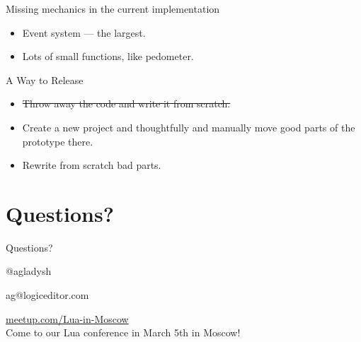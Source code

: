 \documentclass[aspectratio=169,handout,bigger]{beamer}
\newcommand{\soutt}[1]{%
    \renewcommand{\ULthickness}{1pt}%
       \sout{#1}%
    \renewcommand{\ULthickness}{.4pt}%
}
\begin{document}
\begin{frame}{Missing mechanics in the current implementation}
  \begin{itemize}
    \item Event system --- the largest.
    \item Lots of small functions, like pedometer.
  \end{itemize}
\end{frame}


\begin{frame}{A Way to Release}
  \begin{itemize}
    \item \soutt{Throw away the code and write it from scratch.}
    \item Create a new project and thoughtfully and manually
          move good parts of the prototype there.
    \item Rewrite from scratch bad parts.
  \end{itemize}
\end{frame}



\section{Questions?}

\begin{frame}[plain]{Questions?}

\begin{center}
\Huge{@agladysh}
\end{center}

\begin{center}
\Large{ag@logiceditor.com}
\end{center}

\begin{center}
\href{http://meetup.com/Lua-in-Moscow}{meetup.com/Lua-in-Moscow}
\\
Come to our Lua conference in March 5th in Moscow!
\end{center}

\end{frame}

\end{document}
